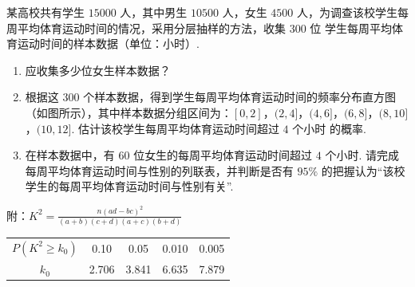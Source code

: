 \begin{problem}
某高校共有学生 \(15000\text{ 人}\)，其中男生 \(10500\text{ 人}\)，女生 \(4500\text{ 人}\)，为调查该校学生每周平均体育运动时间的情况，采用分层抽样的方法，收集 \(300\text{ 位}\) 学生每周平均体育运动时间的样本数据（单位：\(\text{小时}\)）.

\begin{enumerate}
\item 应收集多少位女生样本数据？
\item 根据这 \(300\text{ 个}\)样本数据，得到学生每周平均体育运动时间的频率分布直方图（如图所示），其中样本数据分组区间为：\([0,2]\)，\((2,4]\)，\((4,6]\)，\((6,8]\)，\((8,10]\)，\((10,12]\). 估计该校学生每周平均体育运动时间超过 \(4\text{ 个小时}\) 的概率.
\item 在样本数据中，有 \(60\text{ 位}\)女生的每周平均体育运动时间超过 \(4\text{ 个小时}\). 请完成每周平均体育运动时间与性别的列联表，并判断是否有 \(95\%\) 的把握认为“该校学生的每周平均体育运动时间与性别有关”.
\end{enumerate}

附：\(K^2 = \frac{n(ad - bc)^2}{(a + b)(c + d)(a + c)(b + d)}\)

\begin{center}
\small
\begin{tabular}{c|cccc}
\(P(K^{2} \geqslant k_{0})\) & 0.10 & 0.05 & 0.010 & 0.005 \\
\(k_{0}\) & 2.706 & 3.841 & 6.635 & 7.879
\end{tabular}
\end{center}

\end{problem}

